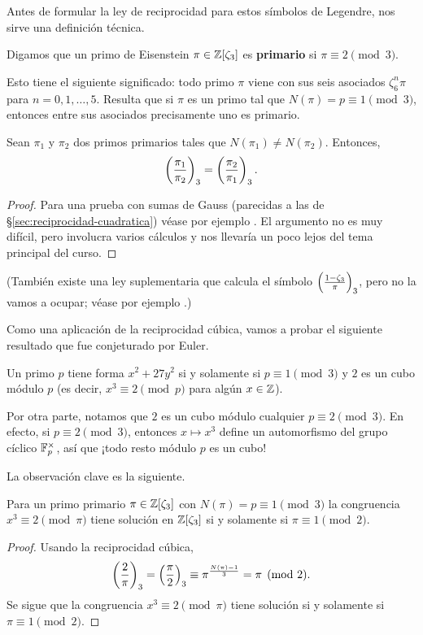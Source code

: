 Antes de formular la ley de reciprocidad para estos símbolos de Legendre,
nos sirve una definición técnica.

\begin{definicion}
  Digamos que un primo de Eisenstein $\pi \in \mathbb{Z} [\zeta_3]$ es
  \textbf{primario} si $\pi \equiv 2 \pmod{3}$.
\end{definicion}

Esto tiene el siguiente significado: todo primo $\pi$ viene con sus seis
asociados $\zeta_6^n \pi$ para $n = 0,1,\ldots,5$. Resulta que si $\pi$ es un
primo tal que $N (\pi) = p \equiv 1 \pmod{3}$, entonces entre sus asociados
precisamente uno es primario.

\begin{teorema}
  Sean $\pi_1$ y $\pi_2$ dos primos primarios tales que
  $N (\pi_1) \ne N (\pi_2)$. Entonces,
  $$\left(\frac{\pi_1}{\pi_2}\right)_3 = \left(\frac{\pi_2}{\pi_1}\right)_3.$$

  \begin{proof}
    Para una prueba con sumas de Gauss (parecidas a las de
    \S\ref{sec:reciprocidad-cuadratica}) véase por ejemplo
    \cite[Chapter~9]{Ireland-Rosen}. El argumento no es muy difícil,
    pero involucra varios cálculos y nos llevaría un poco lejos del tema
    principal del curso.
  \end{proof}
\end{teorema}
(También existe una ley suplementaria que calcula el símbolo
$\left(\frac{1-\zeta_3}{\pi}\right)_3$, pero no la vamos a ocupar;
véase por ejemplo \cite{Williams-1977}.)

Como una aplicación de la reciprocidad cúbica, vamos a probar el siguiente
resultado que fue conjeturado por Euler.

\begin{teorema}
  \label{thm:2-cubo-mod-p}
  Un primo $p$ tiene forma $x^2 + 27 y^2$ si y solamente si
  $p \equiv 1 \pmod{3}$ y $2$ es un cubo módulo $p$
  (es decir, $x^3 \equiv 2 \pmod{p}$ para algún $x \in \mathbb{Z}$).
\end{teorema}

Por otra parte, notamos que $2$ es un cubo módulo cualquier
$p \equiv 2\pmod{3}$. En efecto, si $p \equiv 2\pmod{3}$, entonces
$x \mapsto x^3$ define un automorfismo del grupo cíclico $\mathbb{F}_p^\times$,
así que ¡todo resto módulo $p$ es un cubo!


La observación clave es la siguiente.

\begin{lema}
  Para un primo primario $\pi \in \mathbb{Z} [\zeta_3]$ con
  $N (\pi) = p \equiv 1 \pmod{3}$ la congruencia $x^3 \equiv 2 \pmod{\pi}$ tiene
  solución en $\mathbb{Z} [\zeta_3]$ si y solamente si $\pi \equiv 1 \pmod{2}$.

  \begin{proof}
    Usando la reciprocidad cúbica,
    \[ \left(\frac{2}{\pi}\right)_3 = \left(\frac{\pi}{2}\right)_3 \equiv \pi^{\frac{N(\pi) - 1}{3}}
           = \pi \pmod{2}. \]
    Se sigue que la congruencia $x^3 \equiv 2 \pmod{\pi}$
    tiene solución si y solamente si $\pi \equiv 1 \pmod{2}$.
  \end{proof}
\end{lema}

